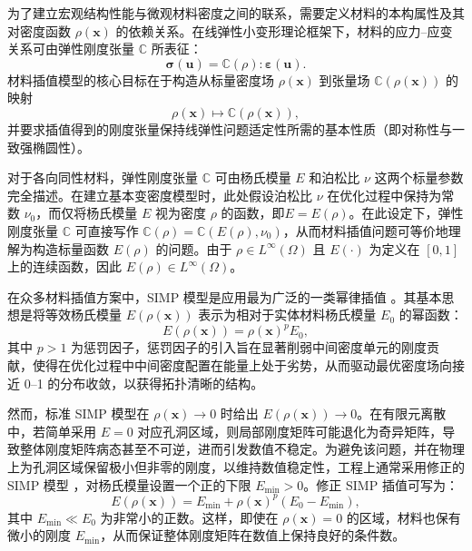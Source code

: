 为了建立宏观结构性能与微观材料密度之间的联系，需要定义材料的本构属性及其对密度函数 $\rho(\boldsymbol{x})$ 的依赖关系。在线弹性小变形理论框架下，材料的应力–应变关系可由弹性刚度张量 $\mathbb{C}$ 所表征：
\[
\boldsymbol{\sigma}(\boldsymbol{u}) = \mathbb{C}(\rho):\boldsymbol{\varepsilon}(\boldsymbol{u}).
\]
材料插值模型的核心目标在于构造从标量密度场 $\rho(\boldsymbol{x})$ 到张量场 $\mathbb{C}(\rho(\boldsymbol{x}))$ 的映射
\[
\rho(\boldsymbol{x})\mapsto \mathbb{C}(\rho(\boldsymbol{x})),
\]
并要求插值得到的刚度张量保持线弹性问题适定性所需的基本性质（即对称性与一致强椭圆性）。

对于各向同性材料，弹性刚度张量 $\mathbb{C}$ 可由杨氏模量 $E$ 和泊松比 $\nu$ 这两个标量参数完全描述。在建立基本变密度模型时，此处假设泊松比 $\nu$ 在优化过程中保持为常数 $\nu_0$，而仅将杨氏模量 $E$ 视为密度 $\rho$ 的函数，即$E=E(\rho)$。在此设定下，弹性刚度张量 $\mathbb{C}$ 可直接写作 $\mathbb{C}(\rho) = \mathbb{C}(E(\rho),\nu_0)$，从而材料插值问题可等价地理解为构造标量函数 $E(\rho)$ 的问题。由于 $\rho\in L^\infty(\Omega)$ 且 $E(\cdot)$ 为定义在 $[0,1]$ 上的连续函数，因此 $E(\rho)\in L^\infty(\Omega)$。

在众多材料插值方案中，SIMP 模型是应用最为广泛的一类幂律插值 \cite{bendsoeOptimalShapeDesign1989a}。其基本思想是将等效杨氏模量 $E(\rho(\boldsymbol{x}))$ 表示为相对于实体材料杨氏模量 $E_0$ 的幂函数：
\begin{equation} \label{eq:ch6_standard_SIMP}
	E(\rho(\boldsymbol{x})) = \rho(\boldsymbol{x})^p E_0,
\end{equation}
其中 $p>1$ 为惩罚因子，惩罚因子的引入旨在显著削弱中间密度单元的刚度贡献，使得在优化过程中中间密度配置在能量上处于劣势，从而驱动最优密度场向接近 0–1 的分布收敛，以获得拓扑清晰的结构。

然而，标准 SIMP 模型在 $\rho(\boldsymbol{x})\to0$ 时给出 $E(\rho(\boldsymbol{x}))\to0$。在有限元离散中，若简单采用 $E=0$ 对应孔洞区域，则局部刚度矩阵可能退化为奇异矩阵，导致整体刚度矩阵病态甚至不可逆，进而引发数值不稳定。为避免该问题，并在物理上为孔洞区域保留极小但非零的刚度，以维持数值稳定性，工程上通常采用修正的 SIMP 模型 \cite{zhouCOCAlgorithmPart1991}，对杨氏模量设置一个正的下限 $E_{\min}>0$。修正 SIMP 插值可写为：
\begin{equation} \label{eq:ch6_modified_SIMP}
	E(\rho(\boldsymbol{x})) = E_{\min} + \rho(\boldsymbol{x})^p(E_0-E_{\min}),
\end{equation}
其中 $E_{\min}\ll{E}_0$ 为非常小的正数。这样，即使在 $\rho(\boldsymbol{x})=0$ 的区域，材料也保有微小的刚度 $E_{\min}$，从而保证整体刚度矩阵在数值上保持良好的条件数。

